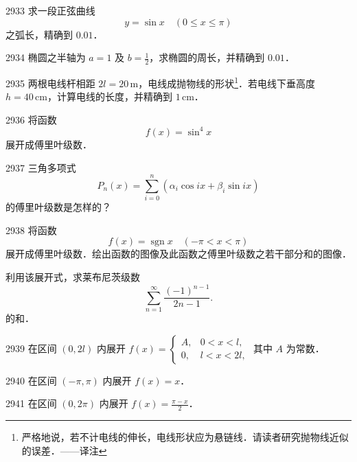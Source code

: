 \begin{prob}[M]{2933}
求一段正弦曲线
\[
y = \sin x \quad (0 \leqslant x \leqslant \pi)
\]
之弧长，精确到 $0.01$．
\end{prob}

\begin{prob}[M]{2934}
椭圆之半轴为 $a = 1$ 及 $b = \frac{1}{2}$，求椭圆的周长，并精确到 $0.01$．
\end{prob}

\begin{prob}[M]{2935}
两根电线杆相距 $2l = 20\,\mathrm{m}$，电线成抛物线的形状\footnote{严格地说，若不计电线的伸长，电线形状应为悬链线．请读者研究抛物线近似的误差．——译注}．若电线下垂高度 $h = 40\,\mathrm{cm}$，计算电线的长度，并精确到 $1\,\mathrm{cm}$．
\end{prob}


\begin{prob}[M]{2936}
将函数
\[
f(x) = \sin^4 x
\]
展开成傅里叶级数．
\end{prob}

\begin{prob}[M]{2937}
三角多项式
\[
P_n(x) = \sum_{i=0}^{n} (\alpha_i \cos ix + \beta_i \sin ix)
\]
的傅里叶级数是怎样的？
\end{prob}

\begin{prob}[L]{2938}
将函数
\[
f(x) = \operatorname{sgn} x \quad (-\pi < x < \pi)
\]
展开成傅里叶级数．绘出函数的图像及此函数之傅里叶级数之若干部分和的图像．

利用该展开式，求莱布尼茨级数
\[
\sum_{n=1}^{\infty} \frac{(-1)^{n-1}}{2n - 1}.
\]
的和．
\end{prob}


\begin{prob}[M]{2939}
在区间 $(0, 2l)$ 内展开 $f(x) = \begin{cases} A, & 0 < x < l, \\ 0, & l < x < 2l, \end{cases}$ 其中 $A$ 为常数．
\end{prob}

\begin{prob}[S]{2940}
在区间 $(-\pi, \pi)$ 内展开 $f(x) = x$．
\end{prob}

\begin{prob}[S]{2941}
在区间 $(0, 2\pi)$ 内展开 $f(x) = \frac{\pi - x}{2}$．
\end{prob}

